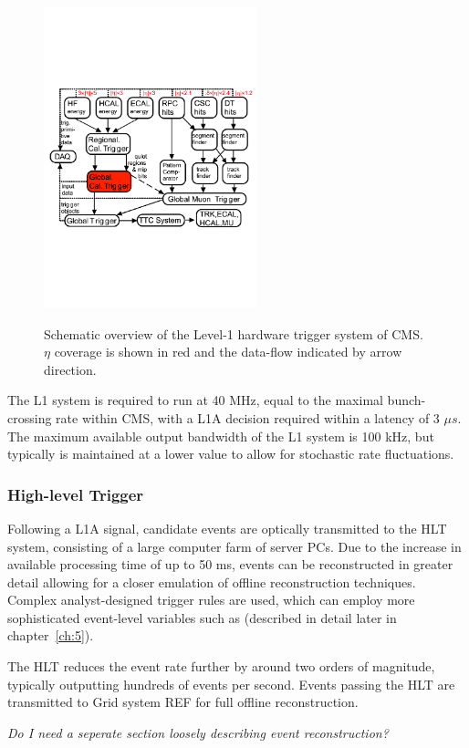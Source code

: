 \begin{figure}[ht!]
  \centering
  \includegraphics[width = 0.55\textwidth]{Figs/machine/L1_diagram.pdf}
  \label{fig:l1_diagram}
  \caption{Schematic overview of the Level-1 hardware trigger system of CMS. $
  \eta$ coverage is shown in red and the data-flow indicated by arrow 
  direction.}
\end{figure}

The L1 system is required to run at 40 MHz, equal to the maximal bunch-crossing
rate within CMS, with a L1A decision required within a latency of 3 $\mu s$. The
maximum available output bandwidth of the L1 system is 100 kHz, but typically is
maintained at a lower value to allow for stochastic rate fluctuations.

\subsubsection{High-level Trigger}

Following a L1A signal, candidate events are optically transmitted to the HLT 
system, consisting of a large computer farm of server 
PCs. Due to the increase in available processing time of up to 50 ms, events can
be reconstructed in greater detail allowing for a closer emulation of offline 
reconstruction techniques. Complex analyst-designed trigger rules are used, 
which can employ more sophisticated event-level variables such as \alphat
(described in detail later in chapter~\ref{ch:5}).

The HLT reduces the event rate further by around two orders of magnitude,
typically
outputting hundreds of events per second. Events passing the HLT are transmitted
to Grid system REF for full offline reconstruction.

\emph{Do I need a seperate section loosely describing event reconstruction?}